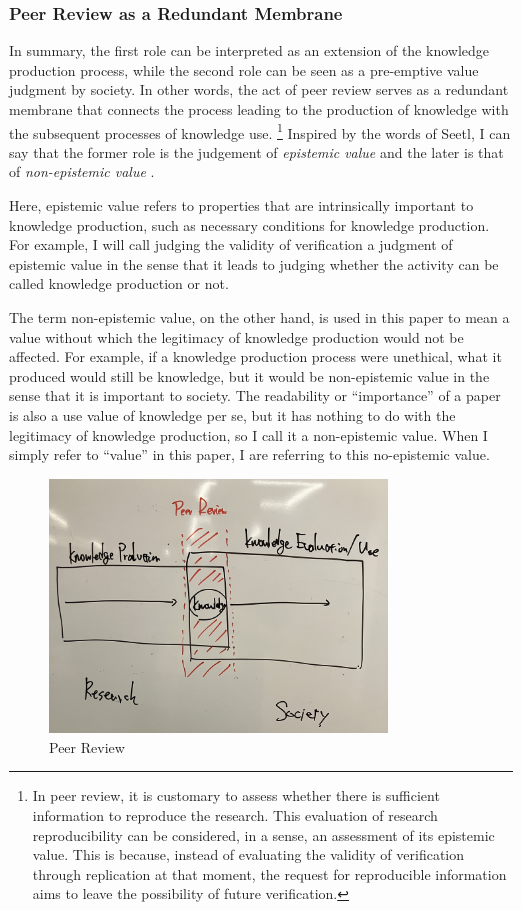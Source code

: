 \documentclass{book}
\begin{document}
\subsubsection{Peer Review as a Redundant Membrane}

In summary, the first role can be interpreted as an extension of the knowledge production process, while the second role can be seen as a pre-emptive value judgment by society. In other words, the act of peer review serves as a redundant membrane that connects the process leading to the production of knowledge with the subsequent processes of knowledge use. \footnote{
In peer review, it is customary to assess whether there is sufficient information to reproduce the research. This evaluation of research reproducibility can be considered, in a sense, an assessment of its epistemic value. This is because, instead of evaluating the validity of verification through replication at that moment, the request for reproducible information aims to leave the possibility of future verification.
} Inspired by the words of Seetl, I can say that the former role is the judgement of \textit{epistemic value} and the later is that of \textit{non-epistemic value} \cite{steel2010epistemic}. 

Here, epistemic value refers to properties that are intrinsically important to knowledge production, such as necessary conditions for knowledge production. For example, I will call judging the validity of verification a judgment of epistemic value in the sense that it leads to judging whether the activity can be called knowledge production or not. 

The term non-epistemic value, on the other hand, is used in this paper to mean a value without which the legitimacy of knowledge production would not be affected. For example, if a knowledge production process were unethical, what it produced would still be knowledge, but it would be non-epistemic value in the sense that it is important to society. The readability or ``importance'' of a paper is also a use value of knowledge per se, but it has nothing to do with the legitimacy of knowledge production, so I call it a non-epistemic value. When I simply refer to ``value'' in this paper, I are referring to this no-epistemic value.

\begin{figure}[htb]
    \centering
    \includegraphics[width=0.8\textwidth]{figs/peer_review.jpg}
    \caption{Peer Review}
    \label{fig:peer_review}
\end{figure}
\end{document}
